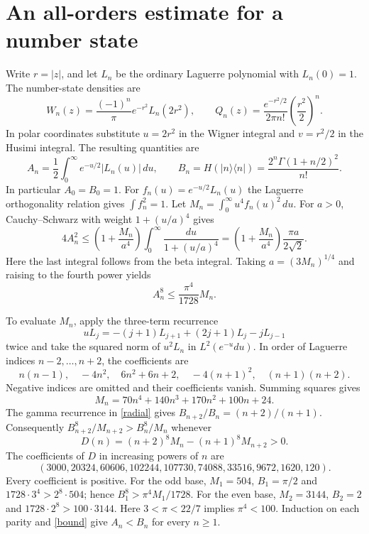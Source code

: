 \documentclass[11pt]{article}
\newcommand{\ket}[1]{\lvert #1\rangle}
\begin{document}
\section{An all-orders estimate for a number state}
Write $r=|z|$, and let $L_n$ be the ordinary Laguerre polynomial with $L_n(0)=1$. The number-state densities are
\[
 W_n(z)=\frac{(-1)^n}{\pi}e^{-r^2} L_n(2r^2),\qquad
 Q_n(z)=\frac{e^{-r^2/2}}{2\pi n!}\left(\frac{r^2}{2}\right)^n.
\]
In polar coordinates substitute $u=2r^2$ in the Wigner integral and $v=r^2/2$ in the Husimi integral. The resulting quantities are
\begin{equation}\label{radial}
 A_n=\frac12\int_0^\infty e^{-u/2}|L_n(u)|\,du,\qquad
 B_n=H(\ket n\!\langle n|)=\frac{2^n\Gamma(1+n/2)^2}{n!}.
\end{equation}
In particular $A_0=B_0=1$. For $f_n(u)=e^{-u/2}L_n(u)$ the Laguerre orthogonality relation gives $\int f_n^2=1$. Let $M_n=\int_0^\infty u^4 f_n(u)^2\,du$. For $a>0$, Cauchy--Schwarz with weight $1+(u/a)^4$ gives
\[
 4A_n^2\le \left(1+\frac{M_n}{a^4}\right)
 \int_0^\infty\frac{du}{1+(u/a)^4}
 =\left(1+\frac{M_n}{a^4}\right)\frac{\pi a}{2\sqrt{2}} .
\]
Here the last integral follows from the beta integral. Taking $a=(3M_n)^{1/4}$ and raising to the fourth power yields
\begin{equation}\label{bound}
 A_n^8\le \frac{\pi^4}{1728}M_n .
\end{equation}

To evaluate $M_n$, apply the three-term recurrence \cite{dlmf}
\[
 uL_j=-(j+1)L_{j+1}+(2j+1)L_j-jL_{j-1}
\]
twice and take the squared norm of $u^2L_n$ in $L^2(e^{-u}du)$. In order of Laguerre indices $n-2,\ldots,n+2$, the coefficients are
\[
 n(n-1),\quad -4n^2,\quad 6n^2+6n+2,\quad -4(n+1)^2,\quad(n+1)(n+2).
\]
Negative indices are omitted and their coefficients vanish. Summing squares gives
\[
 M_n=70n^4+140n^3+170n^2+100n+24.
\]
The gamma recurrence in \eqref{radial} gives $B_{n+2}/B_n=(n+2)/(n+1)$. Consequently $B_{n+2}^8/M_{n+2}>B_n^8/M_n$ whenever
\[
 D(n)=(n+2)^8 M_n-(n+1)^8 M_{n+2}>0.
\]
The coefficients of $D$ in increasing powers of $n$ are
\[
 (3000,20324,60606,102244,107730,74088,33516,9672,1620,120).
\]
Every coefficient is positive. For the odd base, $M_1=504$, $B_1=\pi/2$ and $1728\cdot3^4>2^8\cdot504$; hence $B_1^8>\pi^4 M_1/1728$. For the even base, $M_2=3144$, $B_2=2$ and $1728\cdot 2^8>100\cdot3144$. Here $3<\pi<22/7$ implies $\pi^4<100$. Induction on each parity and \eqref{bound} give $A_n<B_n$ for every $n\ge 1$.
\end{document}
